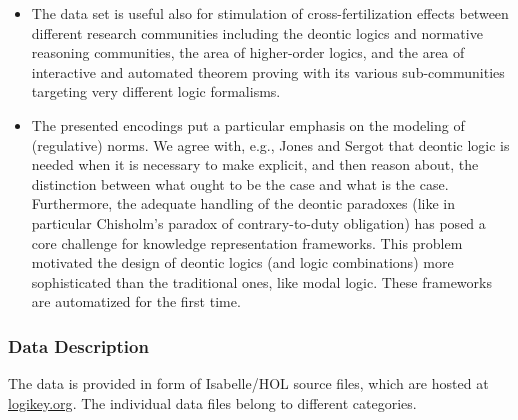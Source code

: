 \documentclass{article}
\newcommand{\comment}[1]{
}
\begin{document}
\begin{itemize}
\item The data set is useful also for stimulation of
  cross-fertilization effects between different research communities including
  the deontic logics  and normative reasoning communities,
  the area of higher-order logics, and the area of  interactive
  and automated theorem proving with its various sub-communities targeting
  very different logic formalisms.

\item The presented encodings put a particular emphasis on the
  modeling of (regulative) norms. We agree with, e.g., Jones and
  Sergot \cite{Jones1992-JONDLI} that deontic logic is needed when it is necessary to make
  explicit, and then reason about, the distinction between what ought
  to be the case and what is the case. Furthermore, the adequate
  handling of the deontic paradoxes (like in particular Chisholm's paradox of contrary-to-duty obligation)
  has posed a core challenge for knowledge representation
  frameworks. This problem motivated the design of deontic logics (and logic combinations) more sophisticated than the traditional ones, like modal logic. These frameworks are automatized for the first time. 


\end{itemize}

\comment{
[Provide 3-6 bullet points explaining why these data are of value to the scientific community. Bullet points 1-3 must specifically answer the question in red next to the bullet point, but do not include the question itself in your answer (i.e.,for the first bullet, you should explain why these data are useful but delete the “Why are these data useful?” question text itself). You may provide up to 3 additional bullet points to outline the value of these data. Please keep points brief.
·	Why are these data useful?
·	Who can benefit from these data?
·	How can these data be used for further insights and development of experiments?
·	 What is the additional value of these data?
·	…
·	…]
}

\subsubsection*{Data Description}
The data is provided in form of Isabelle/HOL source files, which are
hosted at \url{logikey.org}. The individual data files belong to different
categories. 
\end{document}
